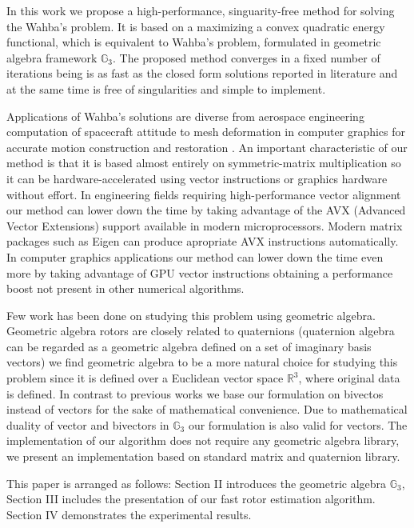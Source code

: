 \documentclass{birkjour}
\numberwithin{equation}{section}
\begin{document}
In this work we propose a high-performance, singuarity-free method for solving the Wahba's problem. It is based on a maximizing a convex quadratic energy functional, which is equivalent to Wahba's problem, formulated in geometric algebra framework $\mathbb{G}_3$. The proposed method converges in a fixed number of iterations being is as fast as the closed form solutions reported in literature and at the same time is free of singularities and simple to implement.

Applications of Wahba's solutions are diverse from aerospace engineering computation of spacecraft attitude \cite{Wu2017} to mesh deformation in computer graphics \cite{Sorkine2007, Sin2013} for accurate motion construction and restoration \cite{Nieto2012, Perwass2009}. An important characteristic of our method is that it is based almost entirely on symmetric-matrix multiplication so it can be hardware-accelerated using vector instructions or graphics hardware without effort. In engineering fields requiring high-performance vector alignment our method can lower down the time by taking advantage of the AVX (Advanced Vector Extensions) support available in modern microprocessors. Modern matrix packages such as Eigen \cite{Eigen} can produce apropriate AVX instructions automatically. In computer graphics applications our method can lower down the time even more by taking advantage of GPU vector instructions obtaining a performance boost not present in other numerical algorithms.

Few work has been done on studying this problem using geometric algebra. Geometric algebra rotors are closely related to quaternions (quaternion algebra can be regarded as a geometric algebra defined on a set of imaginary basis vectors) we find geometric algebra to be a more natural choice for studying this problem since it is defined over a Euclidean vector space $\mathbb R^3$, where original data is defined. In contrast to previous works we base our formulation on bivectos instead of vectors for the sake of mathematical convenience. Due to mathematical duality of vector and bivectors in $\mathbb{G}_3$ our formulation is also valid for vectors. The implementation of our algorithm does not require any geometric algebra library, we present an implementation based on standard matrix and quaternion library. 

\indent This paper is arranged as follows: Section II introduces the geometric algebra $\mathbb{G}_3$, Section III includes the presentation of our fast rotor estimation algorithm. Section IV demonstrates the experimental results.
\end{document}
